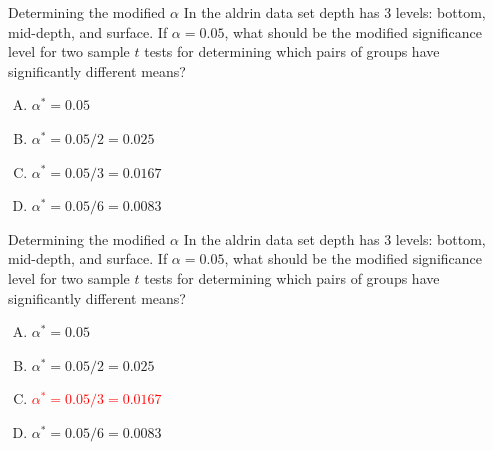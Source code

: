 \documentclass[
  ignorenonframetext,
]{beamer}
\begin{document}
\begin{frame}{Determining the modified \(\alpha\)}
\protect\hypertarget{determining-the-modified-alpha}{}
\alert{In the aldrin data set depth has 3 levels: bottom, mid-depth, and surface. If $\alpha = 0.05$, what should be the modified significance level for two sample $t$ tests for determining which pairs of groups have significantly different means?}

\begin{enumerate}
[A)]
\item
  \(\alpha^* = 0.05\)
\item
  \(\alpha^* = 0.05/2 = 0.025\)
\item
  \(\alpha^* = 0.05/3 = 0.0167\)
\item
  \(\alpha^* = 0.05/6 = 0.0083\)
\end{enumerate}
\end{frame}

\begin{frame}{Determining the modified \(\alpha\)}
\protect\hypertarget{determining-the-modified-alpha-1}{}
\alert{In the aldrin data set depth has 3 levels: bottom, mid-depth, and surface. If $\alpha = 0.05$, what should be the modified significance level for two sample $t$ tests for determining which pairs of groups have significantly different means?}

\begin{enumerate}
[A)]
\item
  \(\alpha^* = 0.05\)
\item
  \(\alpha^* = 0.05/2 = 0.025\)
\item
  \textcolor{red}{$\alpha^* = 0.05/3 = 0.0167$}
\item
  \(\alpha^* = 0.05/6 = 0.0083\)
\end{enumerate}
\end{frame}
\end{document}
